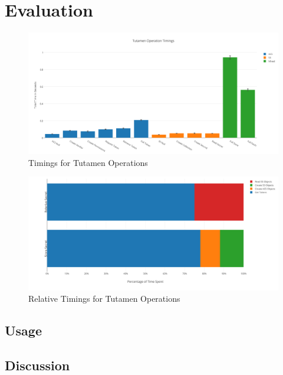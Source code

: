 \section{Evaluation}
\label{sec:eval}

\begin{figure}[th]
  \centering
  \includegraphics[width=\textwidth]{./figs/png/chart-ops-timings.png}
  \caption{Timings for Tutamen Operations}
  \label{fig:eval:abstimings}
\end{figure}

\begin{figure}[th]
  \centering
  \includegraphics[width=\textwidth]{./figs/png/chart-rel-timings.png}
  \caption{Relative Timings for Tutamen Operations}
  \label{fig:eval:reltimings}
\end{figure}

\subsection{Usage}

\subsection{Discussion}
